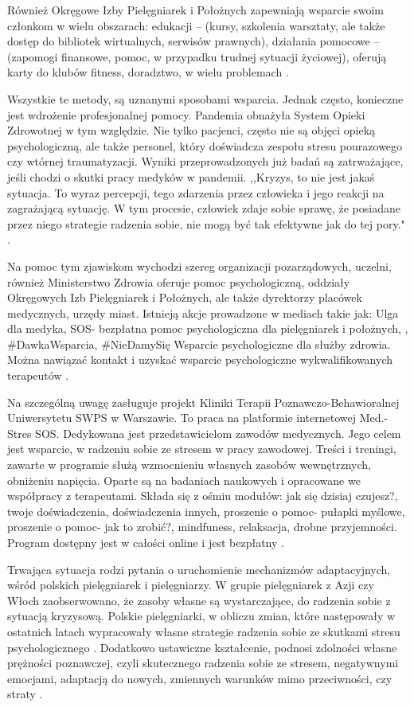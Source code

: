 \documentclass[a4paper,12pt,twoside,openright]{mwrep}
\begin{document}
Również Okręgowe Izby Pielęgniarek i Położnych zapewniają wsparcie swoim członkom w wielu obszarach: edukacji – (kursy, szkolenia warsztaty, ale także dostęp do bibliotek wirtualnych, serwisów prawnych), działania pomocowe – (zapomogi finansowe, pomoc, w przypadku trudnej sytuacji życiowej), oferują karty do klubów fitness, doradztwo, w wielu problemach \cite{izby}.

Wszystkie te metody, są uznanymi sposobami wsparcia. Jednak często, konieczne jest wdrożenie profesjonalnej pomocy. Pandemia obnażyła System Opieki Zdrowotnej w tym względzie. Nie tylko pacjenci, często nie są objęci opieką psychologiczną, ale także personel, który doświadcza zespołu stresu pourazowego czy wtórnej traumatyzacji.  Wyniki przeprowadzonych już badań są zatrważające, jeśli chodzi o skutki pracy medyków w pandemii. ,,Kryzys, to nie jest jakaś sytuacja. To wyraz percepcji, tego zdarzenia przez człowieka i jego reakcji na zagrażającą sytuację. W tym procesie, człowiek zdaje sobie sprawę, że posiadane przez niego strategie radzenia sobie, nie mogą być tak efektywne jak do tej pory." \cite{covid}.

Na pomoc tym zjawiskom wychodzi szereg organizacji pozarządowych, uczelni, również Ministerstwo Zdrowia oferuje pomoc psychologiczną, oddziały Okręgowych Izb Pielęgniarek i Położnych, ale także dyrektorzy placówek medycznych, urzędy miast. Istnieją akcje prowadzone w mediach takie jak: Ulga dla medyka, SOS- bezpłatna pomoc psychologiczna dla pielęgniarek i położnych, , \#DawkaWsparcia, \#NieDamySię Wsparcie psychologiczne dla służby zdrowia. Można nawiązać kontakt i uzyskać wsparcie psychologiczne wykwalifikowanych terapeutów \cite{jak}.

Na szczególną uwagę zasługuje projekt Kliniki Terapii Poznawczo-Behawioralnej Uniwersytetu SWPS w Warszawie. To praca na platformie internetowej Med.-Stres SOS. Dedykowana jest przedstawicielom zawodów medycznych. Jego celem jest wsparcie, w radzeniu sobie ze stresem w pracy zawodowej. Treści i treningi, zawarte w programie służą wzmocnieniu własnych zasobów wewnętrznych, obniżeniu napięcia. Oparte są na badaniach naukowych i opracowane we współpracy z terapeutami. Składa się z ośmiu modułów: jak się dzisiaj czujesz?, twoje doświadczenia, doświadczenia innych, proszenie o pomoc- pułapki myślowe, proszenie o pomoc- jak to zrobić?, mindfuness, relaksacja, drobne przyjemności. Program dostępny jest w całości online i jest bezpłatny \cite{projekt}.

Trwająca sytuacja rodzi pytania o uruchomienie mechanizmów adaptacyjnych, wśród polskich pielęgniarek i pielęgniarzy. W grupie pielęgniarek z Azji czy Włoch zaobserwowano, że zasoby własne są wystarczające, do radzenia sobie z sytuacją kryzysową. Polskie pielęgniarki, w obliczu zmian, które następowały w ostatnich latach wypracowały własne strategie radzenia sobie ze skutkami stresu psychologicznego \cite{covid}. Dodatkowo ustawiczne kształcenie, podnosi zdolności własne prężności poznawczej, czyli skutecznego radzenia sobie ze stresem, negatywnymi emocjami, adaptacją do nowych, zmiennych warunków mimo przeciwności, czy straty \cite{preznosc}. 
 
\end{document}
